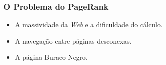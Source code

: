 \documentclass{beamer}
\begin{document}
\begin{frame}
	\frametitle{O Problema do PageRank}
	
\begin{itemize}
	\item A massividade da \textit{Web} e a dificuldade do cálculo.
	\vspace{0.2cm}		
	\item A navegação entre páginas desconexas.
	\vspace{0.2cm}	
	\item A página Buraco Negro.
\end{itemize}	


\end{frame}
\end{document}
